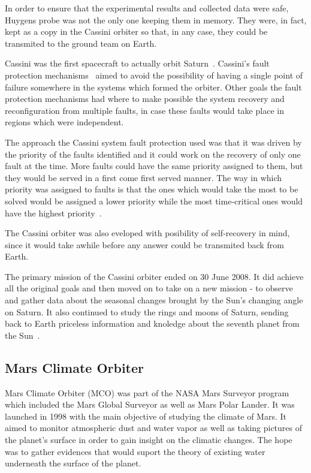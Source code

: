In order to ensure that the experimental results and collected data were safe,
Huygens probe was not the only one keeping them in memory. They were, in fact,
kept as a copy in the Cassini orbiter so that, in any case, they could be
transmited to the ground team on Earth.

Cassini was the first spacecraft to actually orbit Saturn~\cite{ch-nasa}.
Cassini's fault protection mechanisms~\cite{cassini} aimed to avoid the
possibility of having a single point of failure somewhere in the systems which
formed the orbiter. Other goals the fault protection mechanisms had where to
make possible the system recovery and reconfiguration from multiple faults, in
case these faults would take place in regions which were independent.

The approach the Cassini system fault protection used was that it was driven by
the priority of the faults identified and it could work on the recovery of only
one fault at the time. More faults could have the same priority assigned to
them, but they would be served in a first come first served manner. The way in which
priority was assigned to faults is that the ones which would take the most to be
solved would be assigned a lower priority while the most time-critical ones
would have the highest priority~\cite{ft-space-avionics}.

The Cassini orbiter was also eveloped with posibility of self-recovery in mind,
since it would take awhile before any answer could be transmited back from
Earth.

The primary mission of the Cassini orbiter ended on 30 June 2008. It did achieve
all the original goals and then moved on to take on a new mission - to observe
and gather data about the seasonal changes brought by the Sun's changing angle
on Saturn. It also continued to study the rings and moons of Saturn, sending
back to Earth priceless information and knoledge about the seventh planet from
the Sun~\cite{ch-nasa}.

\subsection{Mars Climate Orbiter}
Mars Climate Orbiter (MCO)\cite{mco-nasa} was part of the NASA Mars Surveyor
program which included the Mars Global Surveyor as well as Mars Polar Lander. It
was launched in 1998 with the main objective of studying the climate of Mars. It
aimed to monitor atmospheric dust and water vapor as well as taking pictures of
the planet's surface in order to gain insight on the climatic changes. The hope
was to gather evidences that would suport the theory of existing water
underneath the surface of the planet.

